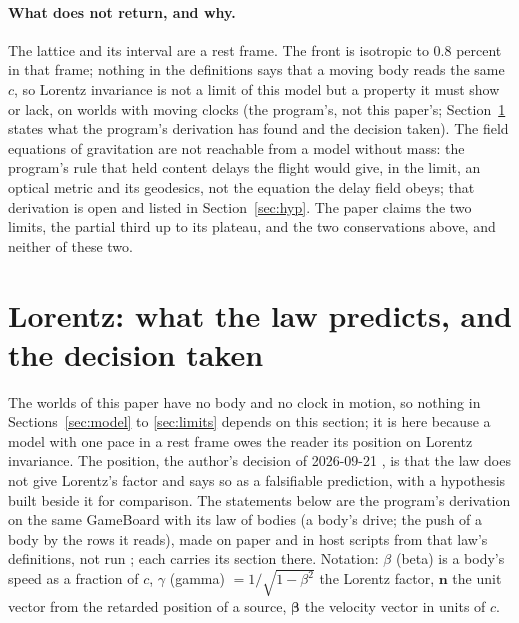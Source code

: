 \documentclass[11pt]{article}
\theoremstyle{definition}
\begin{document}
\paragraph{What does not return, and why.} The lattice and its interval
are a rest frame. The front is isotropic to $0.8$ percent in that frame; nothing in the
definitions says that a moving body reads the same $c$, so Lorentz
invariance is not a limit of this model but a property it must show or
lack, on worlds with moving clocks (the program's, not this paper's;
Section~\ref{sec:lorentz} states what the program's derivation has found
and the decision taken). The
field equations of gravitation are not reachable from a model without
mass: the program's rule that held content delays the flight would give,
in the limit, an optical metric and its geodesics, not the equation the
delay field obeys; that derivation is open and listed in
Section~\ref{sec:hyp}. The paper claims the two limits, the partial third
up to its plateau, and the two conservations above, and neither of these
two.

\section{Lorentz: what the law predicts, and the decision taken}\label{sec:lorentz}

The worlds of this paper have no body and no clock in motion, so nothing
in Sections~\ref{sec:model} to \ref{sec:limits} depends on this section;
it is here because a model with one pace in a rest frame owes the reader
its position on Lorentz invariance. The position, the author's decision
of 2026-09-21 \cite{log}, is that the law does not give Lorentz's
factor and says so as a falsifiable prediction, with a hypothesis built
beside it for comparison. The
statements below are the program's derivation on the same GameBoard with
its law of bodies (a body's drive; the push of a body by the rows it
reads), made on paper and in host scripts from that law's definitions,
not run \cite{derivations}; each carries its section there. Notation:
$\beta$ (beta) is a body's speed as a fraction of $c$, $\gamma$ (gamma)
$= 1/\sqrt{1 - \beta^2}$ the Lorentz factor, $\mathbf n$ the unit vector
from the retarded position of a source, $\boldsymbol\beta$ the velocity
vector in units of $c$.
\end{document}
